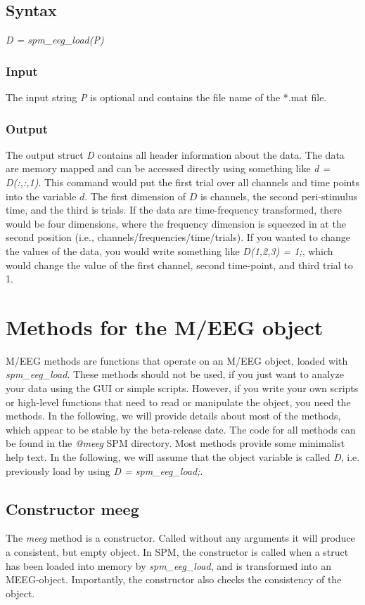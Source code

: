 \subsection{Syntax}
\textit{D = spm\_eeg\_load(P)}
\\

\subsubsection{Input}
The input string {\textit P} is optional and contains the file name of the
*.mat file.

\subsubsection{Output}
The output struct {\textit D} contains all header information about the
data. The data are memory mapped and can be accessed directly using
something like \textit{d = D(:,:,1)}. This command would put the first
trial over all channels and time points into the variable $d$. The
first dimension of $D$ is channels, the second peri-stimulus time, and
the third is trials. If the data are time-frequency transformed, there
would be four dimensions, where the frequency dimension is squeezed in
at the second position (i.e., channels/frequencies/time/trials). If
you wanted to change the values of the data, you would write something
like \textit{D(1,2,3) = 1;}, which would change the value of the first
channel, second time-point, and third trial to 1.


\section{Methods for the M/EEG object}
M/EEG methods are functions that operate on an M/EEG object, loaded
with \textit{spm\_eeg\_load}. These methods should not be used, if you just
want to analyze your data using the GUI or simple scripts. However, if
you write your own scripts or high-level functions that need to read
or manipulate the object, you need the methods. In the following, we
will provide details about most of the methods, which appear to be
stable by the beta-release date. The code for all methods
can be found in the \textit{@meeg} SPM directory. Most methods provide
some minimalist help text. In the following, we will assume that the
object variable is called \textit{D}, i.e. previously load by using \textit{D
  = spm\_eeg\_load;}.

\subsection{Constructor meeg}
The \textit{meeg} method is a constructor. Called without any arguments it
will produce a consistent, but empty object. In SPM, the constructor
is called when a struct has been loaded into memory by
\textit{spm\_eeg\_load}, and is transformed into an
MEEG-object. Importantly, the constructor also checks the consistency
of the object. 

